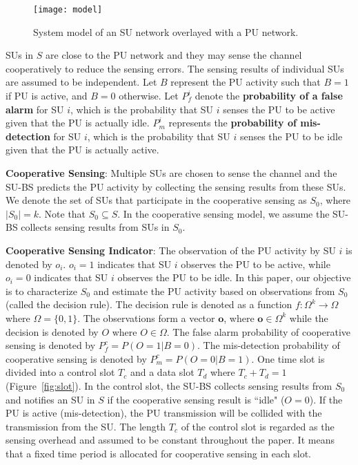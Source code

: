 \documentclass[conference]{IEEEtran}
\begin{document}
\begin{figure}[tb]
    \begin{center}
    \setlength{\unitlength}{1in}
    \texttt{[image: model]}
    \end{center}
\vspace{-1.2em}
\caption{System model of an SU network overlayed with a PU network.}
\vspace{-1.8em}
\label{fig:model}
\end{figure}

SUs in $S$ are close to the PU network and they may sense the channel cooperatively to reduce the sensing errors. The sensing results of individual SUs are assumed to be independent. Let $B$ represent the PU activity such that $B=1$ if PU is active, and $B=0$ otherwise. Let $P_f^i$ denote the {\bf probability of a false alarm} for SU $i$, which is the probability that SU $i$ senses the PU to be active given that the PU is actually idle. $P_m^i$ represents the {\bf probability of mis-detection} for SU $i$, which is the probability that SU $i$ senses the PU to be idle given that the PU is actually active. 

{\bf Cooperative Sensing}: Multiple SUs are chosen to sense the channel and the SU-BS predicts the PU activity by collecting the sensing results from these SUs. We denote the set of SUs that participate in the cooperative sensing as $S_0$, where $|S_0|=k$. Note that $S_0 \subseteq S$. In the cooperative sensing model, we assume the SU-BS collects sensing results from SUs in $S_0$. 

{\bf Cooperative Sensing Indicator}: The observation of the PU activity by SU $i$ is denoted by $o_i$. $o_i=1$ indicates that SU $i$ observes the PU to be active, while $o_i=0$ indicates that SU $i$ observes the PU to be idle. In this paper, our objective is to characterize $S_0$ and estimate the PU activity based on observations from $S_0$ (called the decision rule). The decision rule is denoted as a function $f: \Omega ^{k}\rightarrow \Omega$ where $\Omega=\{0,1\}$. The observations form a vector $\boldsymbol{o}$, where $\boldsymbol{o}\in \Omega ^{k}$ while the decision is denoted by $O$ where $O\in \Omega$. The false alarm probability of cooperative sensing is denoted by $P_f^c=P(O=1|B=0)$. The mis-detection probability of cooperative sensing is denoted by $P_m^c=P(O=0|B=1)$. One time slot is divided into a control slot $T_c$ and a data slot $T_d$ where $T_c+T_d=1$ (Figure~\ref{fig:slot}). In the control slot, the SU-BS collects sensing results from $S_0$ and notifies an SU in $S$ if the cooperative sensing result is ``idle" ($O=0$). If the PU is active (mis-detection), the PU transmission will be collided with the transmission from the SU. The length $T_c$ of the control slot is regarded as the sensing overhead and assumed to be constant throughout the paper. It means that a fixed time period is allocated for cooperative sensing in each slot.  
\end{document}
